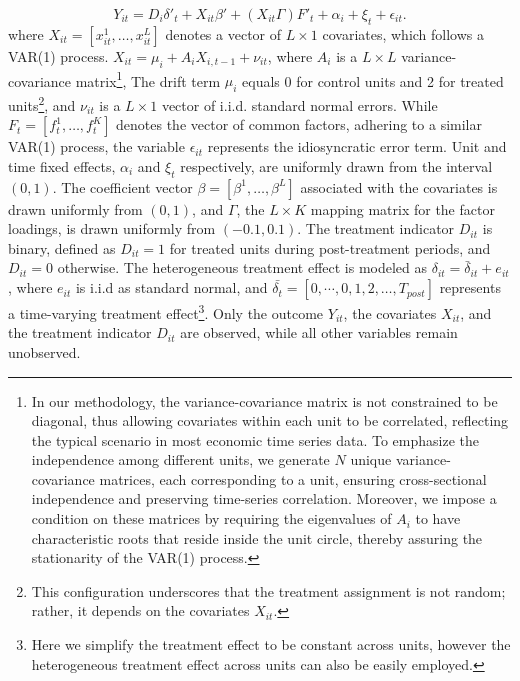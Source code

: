 \documentclass[12pt]{article}
\begin{document}
\begin{equation}
Y_{it} = D_{i} \delta'_{t} + X_{it}\beta' + (X_{it}\Gamma) F'_{t} + \alpha_i + \xi_t + \epsilon_{it}.
\label{eq: dgp}
\end{equation}
where $X_{it} = [x_{it}^1, \ldots, x_{it}^{L}]$ denotes a vector of $L \times 1$ covariates, which follows a VAR(1) process. $X_{it} = \mu_i + A_i X_{i,t-1} + \nu_{it}$, where $A_i$ is a $ L \times L$ variance-covariance matrix\footnote{In our methodology, the variance-covariance matrix is not constrained to be diagonal, thus allowing covariates within each unit to be correlated, reflecting the typical scenario in most economic time series data. To emphasize the independence among different units, we generate $N$ unique variance-covariance matrices, each corresponding to a unit, ensuring cross-sectional independence and preserving time-series correlation. Moreover, we impose a condition on these matrices by requiring the eigenvalues of $A_i$ to have characteristic roots that reside inside the unit circle, thereby assuring the stationarity of the VAR(1) process.}, The drift term $\mu_i$ equals 0 for control units and 2 for treated units\footnote{This configuration underscores that the treatment assignment is not random; rather, it depends on the covariates $X_{it}$.}, and $\nu_{it}$ is a $L \times 1$ vector of i.i.d. standard normal errors. While $F_t = [f_t^1, \ldots, f_t^K]$ denotes the vector of common factors, adhering to a similar VAR(1) process, the variable $\epsilon_{it}$ represents the idiosyncratic error term. Unit and time fixed effects, $\alpha_i$ and $\xi_{t}$ respectively, are uniformly drawn from the interval $(0,1)$. The coefficient vector $\beta = [\beta^1, \ldots, \beta^{L}]$ associated with the covariates is drawn uniformly from $(0,1)$, and $\Gamma$, the $L \times K$ mapping matrix for the factor loadings, is drawn uniformly from $(-0.1, 0.1)$. The treatment indicator $D_{it}$ is binary, defined as $D_{it} = 1$ for treated units during post-treatment periods, and $D_{it} = 0$ otherwise. The heterogeneous treatment effect is modeled as $\delta_{it} = \bar{\delta}_{it} + e_{it}$, where $e_{it}$ is i.i.d as standard normal, and $\bar{\delta_t} = [0, \cdots, 0, 1,2,\ldots, T_{post}]$ represents a time-varying treatment effect\footnote{Here we simplify the treatment effect to be constant across units, however the heterogeneous treatment effect across units can also be easily employed.}. Only the outcome $Y_{it}$, the covariates $X_{it}$, and the treatment indicator $D_{it}$ are observed, while all other variables remain unobserved.
\end{document}
